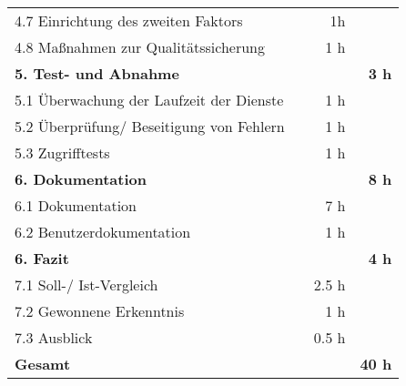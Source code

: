 \begin{tabularx}{\textwidth}{Xrrr}
4.7 Einrichtung des zweiten Faktors &       &    1h   &  \\
\rowcolor{odd}4.8 Maßnahmen zur Qualitätssicherung &      &   1 h   &    \\
\rowcolor{heading}\textbf{5. Test- und Abnahme} & \textbf{} & \textbf{} & \textbf{3 h} \\
5.1 Überwachung der Laufzeit der Dienste &       &   1 h   &  \\
\rowcolor{odd}5.2 Überprüfung/ Beseitigung von Fehlern &      &   1 h   &    \\
5.3 Zugrifftests &       &    1 h   &  \\
\rowcolor{heading}\textbf{6. Dokumentation} & \textbf{} & \textbf{} & \textbf{8 h} \\
\rowcolor{odd}6.1 Dokumentation &      &   7 h   &    \\
6.2 Benutzerdokumentation &       &    1 h   &  \\
\rowcolor{heading}\textbf{6. Fazit} & \textbf{} & \textbf{} & \textbf{4 h} \\
7.1 Soll-/ Ist-Vergleich &       &   2.5 h   &  \\
\rowcolor{odd}7.2 Gewonnene Erkenntnis &      &   1 h   &    \\
7.3 Ausblick &       &    0.5 h   &  \\
\hline
\hline
\rowcolor{heading}\textbf{Gesamt} & \textbf{} & \textbf{} & \textbf{40 h} \\
\end{tabularx}
